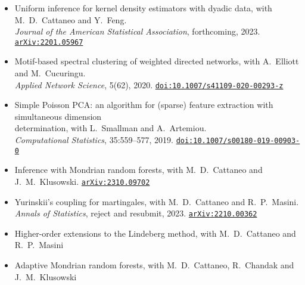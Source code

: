 \documentclass[
  date,
  number,
]{wgu-cv}
\begin{document}
\begin{itemize}

  \item Uniform inference for kernel density estimators with dyadic data,
    with M.\ D.\ Cattaneo and Y.\ Feng. \\
    \emph{Journal of the American Statistical Association}, forthcoming,
    2023.
    \href{https://arxiv.org/abs/2201.05967}{\texttt{arXiv{:}{\allowbreak}2201.05967}}%

  \item Motif-based spectral clustering of weighted directed networks,
    with A.\ Elliott and M.\ Cucuringu. \\
    \emph{Applied Network Science}, 5(62), 2020.
    \href{https://doi.org/10.1007/s41109-020-00293-z}{\texttt{doi:10.1007/s41109-020-00293-z}}%

  \item Simple Poisson PCA: an algorithm for (sparse) feature extraction
    with simultaneous dimension \\ determination,
    with L.\ Smallman and A.\ Artemiou. \\
    \emph{Computational Statistics}, 35:559--577, 2019.
    \href{https://doi.org/10.1007/s00180-019-00903-0}{\texttt{doi:10.1007/s00180-019-00903-0}}%

\end{itemize}

\begin{itemize}

  \item Inference with Mondrian random forests,
    with M.\ D.\ Cattaneo and J.\ M.\ Klusowski.
    \href{https://arxiv.org/abs/2310.09702}{\texttt{arXiv{:}{\allowbreak}2310.09702}}%

  \item Yurinskii's coupling for martingales,
    with M.\ D.\ Cattaneo and R.\ P.\ Masini. \\
    \emph{Annals of Statistics}, reject and resubmit, 2023.
    \href{https://arxiv.org/abs/2210.00362}{\texttt{arXiv{:}{\allowbreak}2210.00362}}%

\end{itemize}

\begin{itemize}

  \item Higher-order extensions to the Lindeberg method,
    with M.\ D.\ Cattaneo and R.\ P.\ Masini

  \item Adaptive Mondrian random forests,
    with M.\ D.\ Cattaneo, R.\ Chandak and J.\ M.\ Klusowski
\end{itemize}
\end{document}
